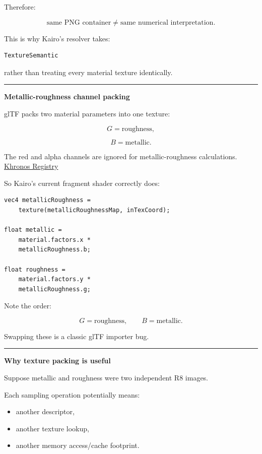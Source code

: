 Therefore:

\[
\boxed{
\text{same PNG container}
\neq
\text{same numerical interpretation}.
}
\]

This is why Kairo's resolver takes:

\begin{verbatim}
TextureSemantic
\end{verbatim}

rather than treating every material texture identically.

\begin{center}\rule{0.5\linewidth}{0.5pt}\end{center}

\textbf{Metallic-roughness channel packing}

glTF packs two material parameters into one texture:

\[
G=\text{roughness},
\]

\[
B=\text{metallic}.
\]

The red and alpha channels are ignored for metallic-roughness calculations. \href{https://registry.khronos.org/glTF/specs/2.0/glTF-2.0.html?utm_source=chatgpt.com}{Khronos Registry}

So Kairo's current fragment shader correctly does:

\begin{verbatim}
vec4 metallicRoughness =
    texture(metallicRoughnessMap, inTexCoord);

float metallic =
    material.factors.x *
    metallicRoughness.b;

float roughness =
    material.factors.y *
    metallicRoughness.g;
\end{verbatim}

Note the order:

\[
\boxed{
G=\text{roughness},\qquad B=\text{metallic}.
}
\]

Swapping these is a classic glTF importer bug.

\begin{center}\rule{0.5\linewidth}{0.5pt}\end{center}

\textbf{Why texture packing is useful}

Suppose metallic and roughness were two independent R8 images.

Each sampling operation potentially means:

\begin{itemize}
\tightlist
\item
  another descriptor,
\item
  another texture lookup,
\item
  another memory access/cache footprint.
\end{itemize}

